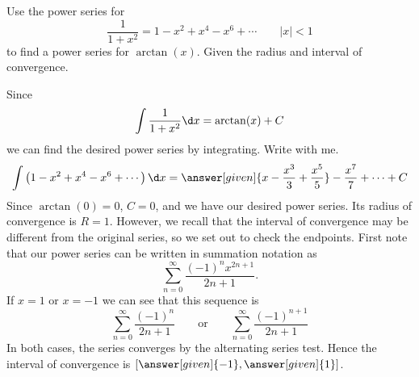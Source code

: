 \documentclass{ximera}
\begin{document}
\begin{example}
  Use the power series for
  \[
  \frac{1}{1+x^2} = 1 - x^2 + x^4 - x^6 + \cdots \qquad|x|< 1 
  \]
  to find a power series for $\arctan(x)$. Given the radius and interval of convergence.
  \begin{explanation}
    Since
    \[
    \int\frac{1}{1+x^2} \d x = \arctan(x)+C
    \]
    we can find the desired power series by integrating. Write with me.
    \[
    \int \left(1 - x^2 + x^4 - x^6 + \cdots\right)\d x = \answer[given]{x - \frac{x^3}{3} + \frac{x^5}{5}} - \frac{x^7}{7} + \cdots +C
    \]
    Since $\arctan(0) = 0$, $C=0$, and we have our desired power
    series. Its radius of convergence is $R=1$. However,
    we recall that the interval of convergence may be different from the original series, so we 
    set out to check the endpoints. First note that our power series can be written in summation notation as
    \[
    \sum_{n=0}^\infty \frac{(-1)^n x^{2n+1}}{2n+1}.
    \]
    If $x=1$ or $x=-1$ we can see that this sequence is
    \[
    \sum_{n=0}^\infty \frac{(-1)^n}{2n+1}\qquad\text{or}\qquad\sum_{n=0}^\infty \frac{(-1)^{n+1}}{2n+1}
    \]
    In both cases, the series converges by the alternating series
    test. Hence the interval of convergence is $[\answer[given]{-1},\answer[given]{1}]$.
  \end{explanation}
\end{example}
\end{document}
